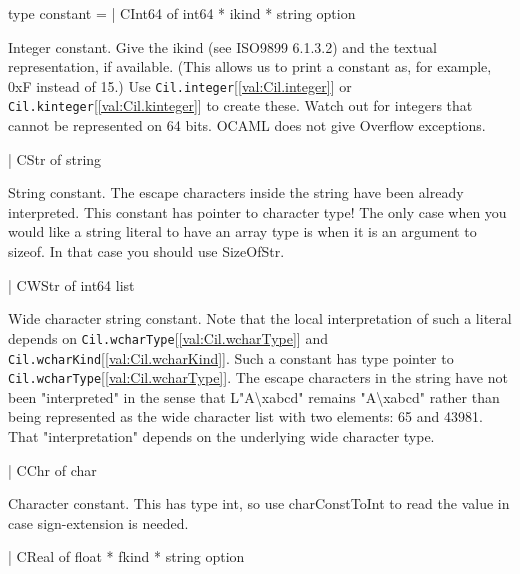 \documentclass[11pt]{article}
\begin{document}
\label{type:Cil.constant}\begin{ocamldoccode}
type constant =
  | CInt64 of int64 * ikind * string option
\end{ocamldoccode}
\begin{ocamldoccomment}
Integer constant. Give the ikind (see ISO9899 6.1.3.2) and the 
 textual representation, if available. (This allows us to print a 
 constant as, for example, 0xF instead of 15.) Use {\tt{Cil.integer}}[\ref{val:Cil.integer}] or 
 {\tt{Cil.kinteger}}[\ref{val:Cil.kinteger}] to create these. Watch out for integers that cannot be 
 represented on 64 bits. OCAML does not give Overflow exceptions.
\end{ocamldoccomment}
\begin{ocamldoccode}
  | CStr of string
\end{ocamldoccode}
\begin{ocamldoccomment}
String constant. The escape characters inside the string have been 
 already interpreted. This constant has pointer to character type! The 
 only case when you would like a string literal to have an array type 
 is when it is an argument to sizeof. In that case you should use 
 SizeOfStr.
\end{ocamldoccomment}
\begin{ocamldoccode}
  | CWStr of int64 list
\end{ocamldoccode}
\begin{ocamldoccomment}
Wide character string constant. Note that the local interpretation
 of such a literal depends on {\tt{Cil.wcharType}}[\ref{val:Cil.wcharType}] and {\tt{Cil.wcharKind}}[\ref{val:Cil.wcharKind}].
 Such a constant has type pointer to {\tt{Cil.wcharType}}[\ref{val:Cil.wcharType}]. The
 escape characters in the string have not been "interpreted" in 
 the sense that L"A{\textbackslash}xabcd" remains "A{\textbackslash}xabcd" rather than being
 represented as the wide character list with two elements: 65 and
 43981. That "interpretation" depends on the underlying wide
 character type.
\end{ocamldoccomment}
\begin{ocamldoccode}
  | CChr of char
\end{ocamldoccode}
\begin{ocamldoccomment}
Character constant.  This has type int, so use charConstToInt
 to read the value in case sign-extension is needed.
\end{ocamldoccomment}
\begin{ocamldoccode}
  | CReal of float * fkind * string option
\end{ocamldoccode}
\end{document}
